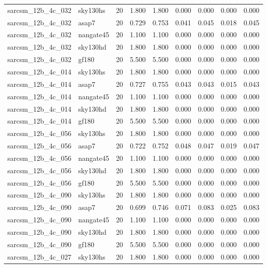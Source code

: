\begin{tabular}{llrrrrrrr}
sarcsm\_12b\_4c\_032 & sky130hs & 20 & 1.800 & 1.800 & 0.000 & 0.000 & 0.000 & 0.000 \\
sarcsm\_12b\_4c\_032 & asap7 & 20 & 0.729 & 0.753 & 0.041 & 0.045 & 0.018 & 0.045 \\
sarcsm\_12b\_4c\_032 & nangate45 & 20 & 1.100 & 1.100 & 0.000 & 0.000 & 0.000 & 0.000 \\
sarcsm\_12b\_4c\_032 & sky130hd & 20 & 1.800 & 1.800 & 0.000 & 0.000 & 0.000 & 0.000 \\
sarcsm\_12b\_4c\_032 & gf180 & 20 & 5.500 & 5.500 & 0.000 & 0.000 & 0.000 & 0.000 \\
sarcsm\_12b\_4c\_014 & sky130hs & 20 & 1.800 & 1.800 & 0.000 & 0.000 & 0.000 & 0.000 \\
sarcsm\_12b\_4c\_014 & asap7 & 20 & 0.727 & 0.755 & 0.043 & 0.043 & 0.015 & 0.043 \\
sarcsm\_12b\_4c\_014 & nangate45 & 20 & 1.100 & 1.100 & 0.000 & 0.000 & 0.000 & 0.000 \\
sarcsm\_12b\_4c\_014 & sky130hd & 20 & 1.800 & 1.800 & 0.000 & 0.000 & 0.000 & 0.000 \\
sarcsm\_12b\_4c\_014 & gf180 & 20 & 5.500 & 5.500 & 0.000 & 0.000 & 0.000 & 0.000 \\
sarcsm\_12b\_4c\_056 & sky130hs & 20 & 1.800 & 1.800 & 0.000 & 0.000 & 0.000 & 0.000 \\
sarcsm\_12b\_4c\_056 & asap7 & 20 & 0.722 & 0.752 & 0.048 & 0.047 & 0.019 & 0.047 \\
sarcsm\_12b\_4c\_056 & nangate45 & 20 & 1.100 & 1.100 & 0.000 & 0.000 & 0.000 & 0.000 \\
sarcsm\_12b\_4c\_056 & sky130hd & 20 & 1.800 & 1.800 & 0.000 & 0.000 & 0.000 & 0.000 \\
sarcsm\_12b\_4c\_056 & gf180 & 20 & 5.500 & 5.500 & 0.000 & 0.000 & 0.000 & 0.000 \\
sarcsm\_12b\_4c\_090 & sky130hs & 20 & 1.800 & 1.800 & 0.000 & 0.000 & 0.000 & 0.000 \\
sarcsm\_12b\_4c\_090 & asap7 & 20 & 0.699 & 0.746 & 0.071 & 0.083 & 0.025 & 0.083 \\
sarcsm\_12b\_4c\_090 & nangate45 & 20 & 1.100 & 1.100 & 0.000 & 0.000 & 0.000 & 0.000 \\
sarcsm\_12b\_4c\_090 & sky130hd & 20 & 1.800 & 1.800 & 0.000 & 0.000 & 0.000 & 0.000 \\
sarcsm\_12b\_4c\_090 & gf180 & 20 & 5.500 & 5.500 & 0.000 & 0.000 & 0.000 & 0.000 \\
sarcsm\_12b\_4c\_027 & sky130hs & 20 & 1.800 & 1.800 & 0.000 & 0.000 & 0.000 & 0.000 \\

\end{tabular}
